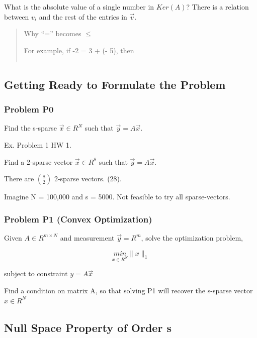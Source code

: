 \documentclass[11pt]{article}
\begin{document}
What is the absolute value of a single number in \(Ker(A)\)? There is a relation
between \(v_i\) and the rest of the entries in \(\vec v\).

\begin{quote}
Why ``='' becomes \(\leq\)

For example,
if -2 = 3 + (- 5), then
\begin{center}
\begin{tabular}{}
\hline
\end{tabular}
\end{center}
\end{quote}

\subsection{Getting Ready to Formulate the Problem}
\label{sec:orgfc57ea0}

\subsubsection{Problem P0}
\label{sec:org9034598}

Find the s-sparse \(\vec x \in R^N\) such that \(\vec y = A \vec x\).

Ex. Problem 1 HW 1.

Find a 2-sparse vector \(\vec x \in R^8\) such that \(\vec y = A \vec x\).

There are \(8 \choose{2}\) 2-sparse vectors. (28).

Imagine N = 100,000 and s = 5000. Not feasible to try all sparse-vectors.

\subsubsection{Problem P1 (Convex Optimization)}
\label{sec:orga4d106a}

Given \(A \in R^{m \times N}\) and measurement \(\vec y = R^m\), solve the
optimization problem,

$$
\underset{x \in R^N}{min} \| x\|_1
$$

subject to constraint \(y = A \vec x\)

Find a condition on matrix A, so that solving P1 will recover the s-sparse
vector \(x \in R^N\)

\subsection{Null Space Property of Order s}
\label{sec:org24aa92d}
\end{document}
